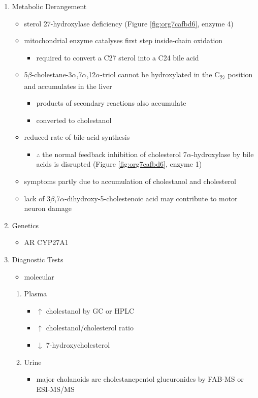 \documentclass{scrartcl}
\begin{document}
\begin{enumerate}
\item Metabolic Derangement
\label{sec:org1574ad7}
\begin{itemize}
\item sterol 27-hydroxylase deficiency (Figure \ref{fig:org7cafbd6}, enzyme 4)
\item mitochondrial enzyme catalyses first step inside-chain oxidation
\begin{itemize}
\item required to convert a C27 sterol into a C24 bile acid
\end{itemize}
\item 5\(\beta\)-cholestane-3\(\alpha\),7\(\alpha\),12\(\alpha\)-triol cannot be hydroxylated in the C\textsubscript{27}
position and accumulates in the liver
\begin{itemize}
\item products of secondary reactions also accumulate
\item converted to cholestanol
\end{itemize}
\item reduced rate of bile-acid synthesis
\begin{itemize}
\item \(\therefore\) the normal feedback inhibition of cholesterol
7\(\alpha\)-hydroxylase by bile acids is disrupted (Figure \ref{fig:org7cafbd6}, enzyme 1)
\end{itemize}
\item symptoms partly due to accumulation of cholestanol and cholesterol
\item lack of 3\(\beta\),7\(\alpha\)-dihydroxy-5-cholestenoic acid may contribute to motor
neuron damage
\end{itemize}

\item Genetics
\label{sec:orgcad0e2d}
\begin{itemize}
\item AR CYP27A1
\end{itemize}
\item Diagnostic Tests
\label{sec:orge3417d9}
\begin{itemize}
\item molecular
\end{itemize}
\begin{enumerate}
\item Plasma
\label{sec:org54e49f4}
\begin{itemize}
\item \(\uparrow\) cholestanol by GC or HPLC
\item \(\uparrow\) cholestanol/cholesterol ratio
\item \(\downarrow\) 7-hydroxycholesterol
\end{itemize}
\item Urine
\label{sec:org6f2012d}
\begin{itemize}
\item major cholanoids are cholestanepentol glucuronides by FAB-MS or ESI-MS/MS
\end{itemize}
\end{enumerate}


\end{enumerate}
\end{document}
